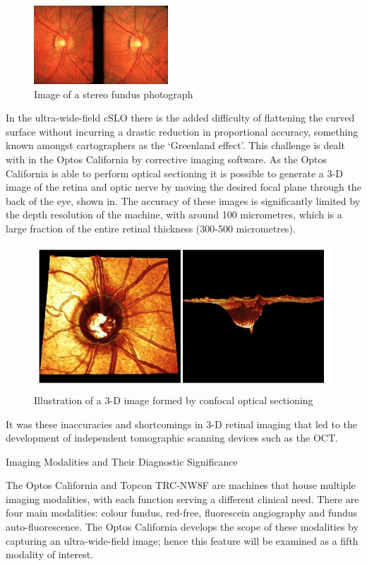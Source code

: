 \begin{figure}[htbp]
\centering
  \includegraphics{figures/stereo}
\caption{Image of a stereo fundus photograph }
\label{fig:stereo}
     \end{figure}

In the ultra-wide-field cSLO there is the added difficulty of flattening the curved surface without incurring a drastic reduction in proportional accuracy, something known amongst cartographers as the ‘Greenland effect’. This challenge is dealt with in the Optos California by corrective imaging software. As the Optos California is able to perform optical sectioning it is possible to generate a 3-D image of the retina and optic nerve by moving the desired focal plane through the back of the eye, shown in. The accuracy of these images is significantly limited by the depth resolution of the machine, with around 100 micrometres, which is a large fraction of the entire retinal thickness (300-500 micrometres). 

\begin{figure}[htbp]
\centering
  \includegraphics{figures/3dcslo}
\caption{Illustration of a 3-D image formed by confocal optical sectioning }
\label{fig:3d}
     \end{figure}

It was these inaccuracies and shortcomings in 3-D retinal imaging that led to the development of independent tomographic scanning devices such as the OCT.


Imaging Modalities and Their Diagnostic Significance

The Optos California and Topcon TRC-NW8F are machines that house multiple imaging modalities, with each function serving a different clinical need. There are four main modalities: colour fundus, red-free, fluorescein angiography and fundus auto-fluorescence. The Optos California develops the scope of these modalities by capturing an ultra-wide-field image; hence this feature will be examined as a fifth modality of interest. 


